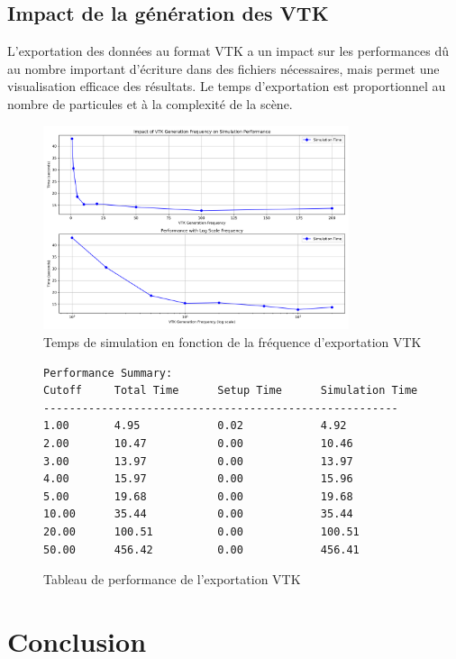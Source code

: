 \documentclass[12pt,a4paper]{article}
\begin{document}
\subsection{Impact de la génération des VTK}
L'exportation des données au format VTK a un impact sur les performances dû au nombre important d'écriture dans des fichiers nécessaires, mais permet une visualisation efficace des résultats. Le temps d'exportation est proportionnel au nombre de particules et à la complexité de la scène.

\begin{figure}[H]
\centering
\includegraphics[width=0.8\textwidth]{perf/vtk_frequency_performance.png}
\caption{Temps de simulation en fonction de la fréquence d'exportation VTK}
\end{figure}

\begin{figure}[H]
\centering
\begin{minipage}{\textwidth}
\begin{verbatim}
Performance Summary:
Cutoff     Total Time      Setup Time      Simulation Time
-------------------------------------------------------
1.00       4.95            0.02            4.92           
2.00       10.47           0.00            10.46          
3.00       13.97           0.00            13.97          
4.00       15.97           0.00            15.96          
5.00       19.68           0.00            19.68          
10.00      35.44           0.00            35.44          
20.00      100.51          0.00            100.51         
50.00      456.42          0.00            456.41    
\end{verbatim}
\end{minipage}
\caption{Tableau de performance de l'exportation VTK}
\end{figure}

\section{Conclusion}
\end{document}
